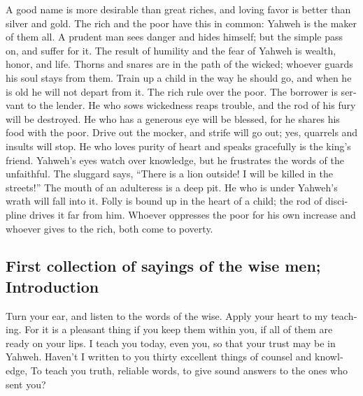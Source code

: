 \begin{paracol}{2}
\begin{otherlanguage}{english}
 A good name is more desirable than great riches, and
loving favor is better than silver and gold.  The rich and
the poor have this in common: Yahweh is the maker of them all.
 A prudent man sees danger and hides himself; but the
simple pass on, and suffer for it.  The result of humility
and the fear of Yahweh is wealth, honor, and life.  Thorns
and snares are in the path of the wicked; whoever guards his soul stays
from them.  Train up a child in the way he should go, and
when he is old he will not depart from it.  The rich rule
over the poor. The borrower is servant to the lender.  He
who sows wickedness reaps trouble, and the rod of his fury will be
destroyed.  He who has a generous eye will be blessed, for
he shares his food with the poor.  Drive out the mocker,
and strife will go out; yes, quarrels and insults will stop.
 He who loves purity of heart and speaks gracefully is
the king's friend.  Yahweh's eyes watch over knowledge,
but he frustrates the words of the unfaithful.  The
sluggard says, ``There is a lion outside! I will be killed in the
streets!''  The mouth of an adulteress is a deep pit. He
who is under Yahweh's wrath will fall into it.  Folly is
bound up in the heart of a child; the rod of discipline drives it far
from him.  Whoever oppresses the poor for his own
increase and whoever gives to the rich, both come to poverty.

\hypertarget{first-collection-of-sayings-of-the-wise-men-introduction}{%
\subsection{First collection of sayings of the wise men;
Introduction}\label{first-collection-of-sayings-of-the-wise-men-introduction}}

 Turn your ear, and listen to the words of the wise.
Apply your heart to my teaching.  For it is a pleasant
thing if you keep them within you, if all of them are ready on your
lips.  I teach you today, even you, so that your trust
may be in Yahweh.  Haven't I written to you thirty
excellent things of counsel and knowledge,  To teach you
truth, reliable words, to give sound answers to the ones who sent you?

\hypertarget{individual-reminders}{%
}
\end{otherlanguage}
\end{paracol}
